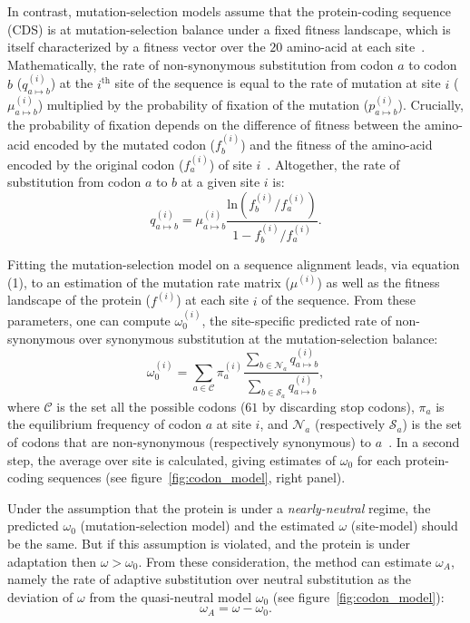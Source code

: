 \documentclass{article}
\begin{document}
In contrast, mutation-selection models assume that the protein-coding sequence (CDS) is at mutation-selection balance under a fixed fitness landscape, which is itself characterized by a fitness vector over the $20$ amino-acid at each site~\citep{Yang2008, Halpern1998, Rodrigue2010}.
Mathematically, the rate of non-synonymous substitution from codon $a$ to codon $b$ ($q_{a \mapsto b}^{(i)}$) at the $i^{\mathrm{th}}$ site of the sequence is equal to the rate of mutation at site $i$ ($\mu_{a \mapsto b}^{(i)}$) multiplied by the probability of fixation of the mutation ($p_{a \mapsto b}^{(i)}$).
Crucially, the probability of fixation depends on the difference of fitness between the amino-acid encoded by the mutated codon ($f_b^{(i)}$) and the fitness of the amino-acid encoded by the original codon ($f_a^{(i)}$) of site $i$~\citep{wright_evolution_1931, fisher_genetical_1930}.
Altogether, the rate of substitution from codon $a$ to $b$ at a given site $i$ is:
\begin{equation}
	q_{a \mapsto b}^{(i)} = \mu_{a \mapsto b}^{(i)} \dfrac{\mathrm{ln}(f_b^{(i)} / f_a^{(i)})}{1 - f_b^{(i)} / f_a^{(i)}}.
\end{equation}

Fitting the mutation-selection model on a sequence alignment leads, via equation (1), to an estimation of the mutation rate matrix ($\mu^{(i)}$) as well as the fitness landscape of the protein ($f^{(i)}$) at each site $i$ of the sequence.
From these parameters, one can compute $\omega_{0}^{(i)}$, the site-specific predicted rate of non-synonymous over synonymous substitution at the mutation-selection balance:
\begin{equation}
	\omega_{0}^{(i)} = \sum_{a \in  \mathcal{C}} \pi_a^{(i)}  \dfrac{\sum_{b \in  \mathcal{N}_a} q_{a \mapsto b}^{(i)}}{\sum_{b \in \mathcal{S}_a} q_{a \mapsto b}^{(i)}},
\end{equation}
where $\mathcal{C}$ is the set all the possible codons ($61$ by discarding stop codons), $\pi_a$ is the equilibrium frequency of codon $a$ at site $i$, and $\mathcal{N}_a$ (respectively $\mathcal{S}_a$) is the set of codons that are non-synonymous (respectively synonymous) to $a$~\citep{Spielman2015, Rodrigue2016}.
In a second step, the average over site is calculated, giving estimates of $\omega_0$ for each protein-coding sequences (see figure~\ref{fig:codon_model}, right panel).

Under the assumption that the protein is under a \textit{nearly-neutral} regime,  the predicted $\omega_0$ (mutation-selection model) and the estimated $\omega$ (site-model) should be the same.
But if this assumption is violated, and the protein is under adaptation then $\omega > \omega_0$.
From these consideration, the method can estimate $\omega_A$, namely the rate of adaptive substitution over neutral substitution as the deviation of $\omega$ from the quasi-neutral model $\omega_0$ (see figure~\ref{fig:codon_model}):
\begin{equation}
	\omega_A = \omega - \omega_0.
\end{equation}
\end{document}
